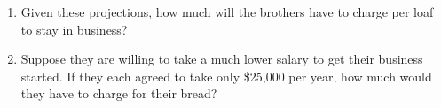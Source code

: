 \documentclass[14 pt]{beamer}
\begin{document}
\begin{frame}[t]
\begin{columns}[t]
\begin{column}{0.45\textwidth}
\begin{enumerate}
  \item Given these projections, how much will the brothers have to charge per loaf to stay in business?
  \item Suppose they are willing to take a much lower salary to get their business started. If they each agreed to take only \$25,000 per year, how much would they have to charge for their bread?
\end{enumerate}
\end{column}
\end{columns}
\end{frame}


%
%

\end{document}
